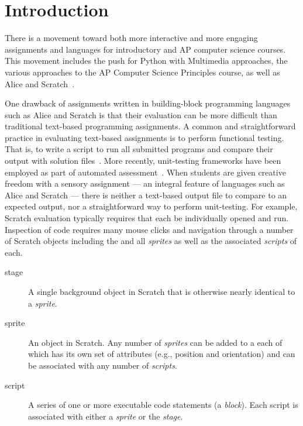 \section{Introduction}
There is a movement toward both more interactive and more engaging assignments
and languages for introductory and AP computer science courses. This movement
includes the push for Python with Multimedia approaches, the various approaches
to the AP Computer Science Principles course, as well as Alice and
Scratch~\cite{Adams:2012:SLP:2157136.2157319, Forte:2004:CCC:962752.962945,
  Simon:2010:ERC:1822090.1822151, Snyder:2012:FFC:2189835.2189852,
  Cooper:2003:TOI:611892.611966, Maloney:2010:SPL:1868358.1868363}.

One drawback of assignments written in building-block programming languages
such as Alice and Scratch is that their evaluation can be more difficult than
traditional text-based programming assignments.  A common and straightforward
practice in evaluating text-based assignments is to perform functional
testing. That is, to write a script to run all submitted programs and compare
their output with solution files~\cite{Jackson:1997:GSP:268084.268210}.  More
recently, unit-testing frameworks have been employed as part of automated
assessment~\cite{Spacco:2006:EMD:1140124.1140131,
  Edwards:2003:RCS:949344.949390}.  When students are given creative freedom
with a sensory assignment --- an integral feature of languages such as Alice
and Scratch --- there is neither a text-based output file to compare to an
expected output, nor a straightforward way to perform unit-testing.  For
example, Scratch evaluation typically requires that each \sprogram{} be
individually opened and run.  Inspection of \sprogram{} code requires many
mouse clicks and navigation through a number of Scratch objects including the
\stage{} and all \emph{sprites} as well as the associated \emph{scripts} of
each.

\begin{description}
\item[stage] A single background object in Scratch that is otherwise nearly
  identical to a \emph{sprite}.
\item[sprite] An object in Scratch. Any number of \emph{sprites} can be added
  to a \sprogram{} each of which has its own set of attributes (e.g., position
  and orientation) and can be associated with any number of \emph{scripts}.
\item[script] A series of one or more executable code statements (a
  \emph{block}). Each script is associated with either a \emph{sprite} or the
  \emph{stage}.
\end{description}

